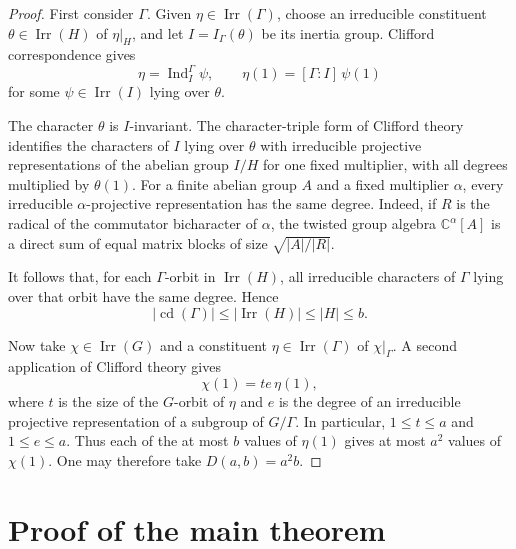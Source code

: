 \documentclass[11pt]{article}
\newcommand{\Irr}{\operatorname{Irr}}
\newcommand{\cd}{\operatorname{cd}}
\begin{document}
\begin{proof}
First consider $\Gamma$.  Given $\eta\in\Irr(\Gamma)$, choose an irreducible
constituent $\theta\in\Irr(H)$ of $\eta|_H$, and let
$I=I_\Gamma(\theta)$ be its inertia group.  Clifford correspondence gives
\[
 \eta=\operatorname{Ind}_I^\Gamma\psi,
 \qquad
 \eta(1)=[\Gamma:I]\,\psi(1)
\]
for some $\psi\in\Irr(I)$ lying over $\theta$.

The character $\theta$ is $I$-invariant.  The character-triple form of
Clifford theory identifies the characters of $I$ lying over $\theta$ with
irreducible projective representations of the abelian group $I/H$ for one
fixed multiplier, with all degrees multiplied by $\theta(1)$.  For a finite
abelian group $A$ and a fixed multiplier $\alpha$, every irreducible
$\alpha$-projective representation has the same degree.  Indeed, if $R$ is
the radical of the commutator bicharacter of $\alpha$, the twisted group
algebra $\mathbb C^\alpha[A]$ is a direct sum of equal matrix blocks of size
$\sqrt{|A|/|R|}$.

\pagebreak
It follows that, for each $\Gamma$-orbit in $\Irr(H)$, all irreducible
characters of $\Gamma$ lying over that orbit have the same degree.  Hence
\[
 |\cd(\Gamma)|\leq |\Irr(H)|\leq |H|\leq b.
\]

Now take $\chi\in\Irr(G)$ and a constituent
$\eta\in\Irr(\Gamma)$ of $\chi|_\Gamma$.  A second application of Clifford
theory gives
\[
 \chi(1)=t e\,\eta(1),
\]
where $t$ is the size of the $G$-orbit of $\eta$ and $e$ is the degree of an
irreducible projective representation of a subgroup of $G/\Gamma$.  In
particular, $1\leq t\leq a$ and $1\leq e\leq a$.  Thus each of the at most
$b$ values of $\eta(1)$ gives at most $a^2$ values of $\chi(1)$.  One may
therefore take $D(a,b)=a^2b$.
\end{proof}

\section{Proof of the main theorem}
\end{document}

